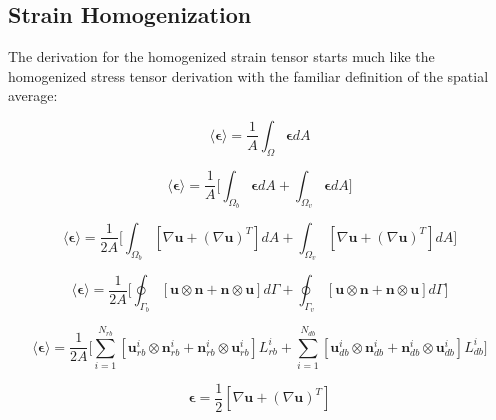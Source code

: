 \subsection{Strain Homogenization}
The derivation for the homogenized strain tensor starts much like the homogenized stress tensor derivation with the familiar definition of the spatial average:

\begin{equation}
\label{eqn:strain2}
\langle \boldsymbol{\epsilon} \rangle = 
\frac{1}{A} \int_\Omega \boldsymbol{\epsilon} {dA}
\end{equation}

\begin{equation}
\label{eqn:strain3}
\langle \boldsymbol{\epsilon} \rangle = 
\frac{1}{A} \bigg \lbrack {\int_{\Omega_{b}} \boldsymbol{\epsilon} { dA} + 
\int_{\Omega_{v}} \boldsymbol{\epsilon} {dA}} \bigg \rbrack
\end{equation}

\begin{equation}
\label{eqn:strain4}
\langle \boldsymbol{\epsilon} \rangle = 
\frac{1}{2 A} \bigg \lbrack {\int_{\Omega_{b}} \left[ \nabla \mathbf{u} + 
\left( \nabla \mathbf{u} \right)^{T} \right] {dA} +
\int_{\Omega_{v}} \left[ \nabla \mathbf{u} + 
\left( \nabla \mathbf{u} \right)^{T} \right] {dA}} \bigg \rbrack
\end{equation}

\begin{equation}
\label{eqn:strain5}
\langle \boldsymbol{\epsilon} \rangle = 
\frac{1}{2 A} \bigg \lbrack {\oint_{\Gamma_{b}} \left[ \mathbf{u} \otimes \mathbf{n} + 
\mathbf{n} \otimes \mathbf{u} \right] {d \Gamma} +
\oint_{\Gamma_{v}} \left[ \mathbf{u} \otimes \mathbf{n} + 
\mathbf{n} \otimes \mathbf{u} \right] { d \Gamma}} \bigg \rbrack
\end{equation}

\begin{equation}
\label{eqn:strain6}
\langle \boldsymbol{\epsilon} \rangle = 
\frac{1}{2 A} \bigg \lbrack {\sum_{i=1}^{N_{rb}} \left[ \mathbf{u}_{rb}^i \otimes \mathbf{n}_{rb}^i + 
\mathbf{n}_{rb}^i \otimes \mathbf{u}_{rb}^i \right] {L_{rb}^i} +
\sum_{i=1}^{N_{db}} \left[ \mathbf{u}_{db}^i \otimes \mathbf{n}_{db}^i + 
\mathbf{n}_{db}^i \otimes \mathbf{u}_{db}^i \right] {L_{db}^i}} \bigg \rbrack
\end{equation}






\begin{equation}
\label{eqn:strain1}
\boldsymbol{\epsilon} = 
\frac{1}{2}  \left[ \nabla \mathbf{u} + \left( \nabla \mathbf{u} \right)^{T} \right]
\end{equation}